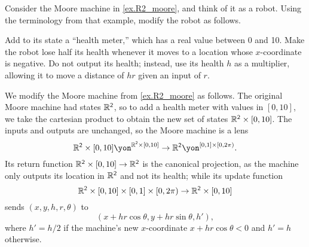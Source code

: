 \documentclass[Book-Poly]{subfiles}
\begin{document}
\begin{exercise}
Consider the Moore machine in \cref{ex.R2_moore}, and think of it as a robot. Using the terminology from that example, modify the robot as follows.

Add to its state a ``health meter,'' which has a real value between 0 and 10. Make the robot lose half its health whenever it moves to a location whose $x$-coordinate is negative. Do not output its health; instead, use its health $h$ as a multiplier, allowing it to move a distance of $hr$ given an input of $r$.
\begin{solution}
We modify the Moore machine from \cref{ex.R2_moore} as follows.
The original Moore machine had states $\mathbb{R}^{\textsf{2}}$, so to add a health meter with values in $[0,10]$, we take the cartesian product to obtain the new set of states $\mathbb{R}^{\textsf{2}} \times [0,10]$.
The inputs and outputs are unchanged, so the Moore machine is a lens
\[
    \rr^\2 \times [0,10] \yon^{\rr^\2 \times [0,10]} \to \rr^\2 \yon^{[0,1] \times [0,2\pi)}.
\]
Its return function $\mathbb{R}^{\textsf{2}} \times [0,10] \to \mathbb{R}^{\textsf{2}}$ is the canonical projection, as the machine only outputs its location in $\mathbb{R}^{\textsf{2}}$ and not its health; while its update function
\[
    \mathbb{R}^{\textsf{2}} \times [0,10] \times [0,1] \times [0,2\pi) \to \mathbb{R}^{\textsf{2}} \times [0,10]
\]
sends $(x, y, h, r, \theta)$ to
\[
    (x + hr\cos\theta, y + hr\sin\theta, h'),
\]
where $h' = h/2$ if the machine's new $x$-coordinate $x + hr\cos\theta < 0$ and $h' = h$ otherwise.
\end{solution}
\end{exercise}
\end{document}
